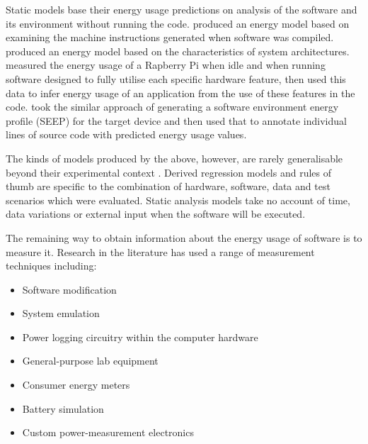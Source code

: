 Static models base their energy usage predictions on analysis of the software and its environment without running the code.  \citep{Ibrahim2011} produced an energy model based on examining the machine instructions generated when software was compiled. \citet{Stier2015} produced an energy model based on the characteristics of system architectures. \citet{Ardito2018} measured the energy usage of a Rapberry Pi when idle and when running software designed to fully utilise each specific hardware feature, then used this data to infer energy usage of an application from the use of these features in the code. \citet{Hao2013} took the similar approach of generating a software environment energy profile (SEEP) for the target device and then used that to annotate individual lines of source code with predicted energy usage values.

The kinds of models produced by the above, however, are rarely generalisable beyond their experimental context \citep{Colmant2018}. Derived regression models and rules of thumb are specific to the combination of hardware, software, data and test scenarios which were evaluated. Static analysis models take no account of time, data variations or external input when the software will be executed.

The remaining way to obtain information about the energy usage of software is to measure it. Research in the literature has used a range of measurement techniques including:

\begin{itemize}
    \item Software modification \citep{Seo2008} \citep{Do2009} \citep{Sabovic2020}
    \item System emulation \citep{Sinha2001} \citep{Gurumurthi2002} \citep{Wilke2013}
    \item Power logging circuitry within the computer hardware \citep{Dutta2008} \citep{Kansal2008} \citep{Noureddine2012a}
    \item General-purpose lab equipment \citep{Flinn1999} \citep{Farkas2000} \citep{Ge2009} \citep{Ardito2018}
    \item Consumer energy meters \citep{Kaup2014} \citep{Kaup2018} \citep{Bekaroo2016}
    \item Battery simulation \citep{Zhou2013a} \citep{Naderiparizi2016}
    \item Custom power-measurement electronics \citep{Jiang2007} \citep{Stathopoulos2008} \citep{Andersen2009} \citep{Astudillo-Salinas2016}
\end{itemize}


